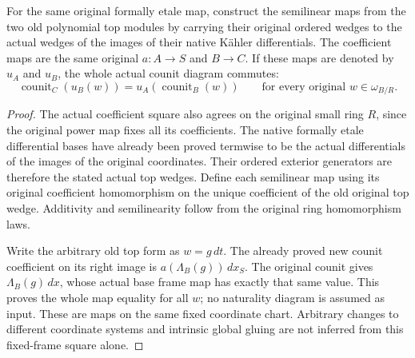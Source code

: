 \begin{theorem}
\label{thm:kn-nadel-etale-top-frame-counit-square}
\leanok
For the same original formally etale map, construct the semilinear
maps from the two old polynomial top modules by carrying their
original ordered wedges to the actual wedges of the images of their
native K\"ahler differentials.  The coefficient maps are the same
original $a:A\to S$ and $B\to C$.  If these maps are denoted by
$u_A$ and $u_B$, the whole actual counit diagram commutes:
\[
 \operatorname{counit}_C(u_B(w))
   =u_A(\operatorname{counit}_B(w))
 \qquad\text{for every original }w\in\omega_{B/R}.
\]
\end{theorem}
\begin{proof}
The actual coefficient square also agrees on the original small
ring $R$, since the original power map fixes all its coefficients.
The native formally etale differential bases have already been
proved termwise to be the actual differentials of the images of
the original coordinates.  Their ordered exterior generators are
therefore the stated actual top wedges.  Define each semilinear
map using its original coefficient homomorphism on the unique
coefficient of the old original top wedge.  Additivity and
semilinearity follow from the original ring homomorphism laws.

Write the arbitrary old top form as $w=g\,dt$.  The already proved
new counit coefficient on its right image is
$a(\Lambda_B(g))\,dx_S$.  The original counit gives
$\Lambda_B(g)\,dx$, whose actual base frame map has exactly that
same value.  This proves the whole map equality for all $w$;
no naturality diagram is assumed as input.  These are maps on
the same fixed coordinate chart.  Arbitrary changes to different
coordinate systems and intrinsic global gluing are not inferred
from this fixed-frame square alone.
\end{proof}

